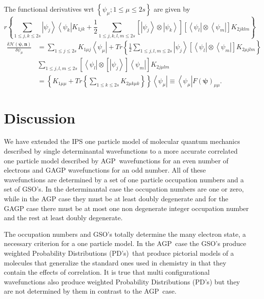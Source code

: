 \documentclass[aps,preprint]{revtex4}%
\begin{document}
The functional derivatives wrt $\left\{  \psi_{\mu};1\leq\mu\leq2s\right\}  $
are given by%
\begin{equation}
r\left\{  \sum_{1\leq j,k\leq2s}\left\vert \psi_{j}\right\rangle \left\langle
\psi_{k}\right\vert K_{1jk}+\frac{1}{2}\sum_{1\leq j,k,l,m\leq2s}\left[
\left\vert \psi_{j}\right\rangle \otimes\left\vert \psi_{k}\right\rangle
\right]  \left[  \left\langle \psi_{l}\right\vert \otimes\left\langle \psi
_{m}\right\vert \right]  K_{2jklm}\right\}
\end{equation}
\begin{align}
\frac{\delta\mathcal{H}\left(  \mathbf{\psi,n}\right)  }{\delta\psi_{\mu}}  &
=\sum_{1\leq j\leq2s}K_{1\mu j}\left\langle \psi_{\mu}\right\vert +Tr\left\{
\frac{1}{2}\sum_{1\leq j,l,m\leq2s}\left\vert \psi_{j}\right\rangle \left[
\left\langle \psi_{l}\right\vert \otimes\left\langle \psi_{m}\right\vert
\right]  K_{2\mu jlm}\right\} \nonumber\\
&  \sum_{1\leq j,l,m\leq2s}\left[  \left\langle \psi_{l}\right\vert
\otimes\left[  \left\vert \psi_{j}\right\rangle \right]  \left\langle \psi
_{m}\right\vert \right]  K_{2j\mu lm}\\
&  =\left\{  K_{1\mu\mu}+Tr\left\{  \sum_{1\leq k\leq2s}K_{2\mu k\mu
k}\right\}  \right\}  \left\langle \psi_{\mu}\right\vert \equiv\left\langle
\psi_{\mu}\right\vert F\left(  \mathbf{\psi}\right)  _{\mu\mu}.
\end{align}


\section{Discussion\label{Discussion}}

We have extended the IPS one particle model of molecular quantum mechanics
described by single determinantal wavefunctions to a more accurate correlated
one particle model described by AGP\ wavefunctions for an even number of
electrons and GAGP wavefunctions for an odd number. All of these wavefunctions
are determined by a set of one particle occupation numbers and a set of GSO's.
In the determinantal case the occupation numbers are one or zero, while in the
AGP case they must be at least doubly degenerate and for the GAGP case there
must be at most one non degenerate integer occupation number and the rest at
least doubly degenerate.

The occupation numbers and GSO's totally determine the many electron state, a
necessary criterion for a one particle model. In the AGP\ case the GSO's
produce weighted Probability Distributions (PD's)\ that produce pictorial
models of a molecules that generalize the standard ones used in chemistry in
that they contain the effects of correlation. It is true that multi
configurational wavefunctions also produce weighted Probability Distributions
(PD's) but they are not determined by them in contrast to the AGP\ case.
\end{document}
